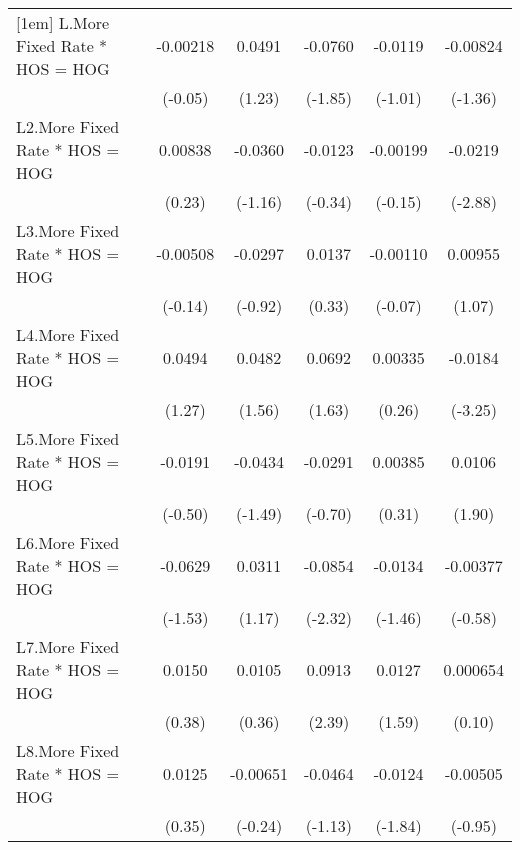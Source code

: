 {\begin{longtable}{l*{5}{c}}
[1em]
L.More Fixed Rate * HOS = HOG& -0.00218         &   0.0491         &  -0.0760         &  -0.0119         & -0.00824         \\
                &  (-0.05)         &   (1.23)         &  (-1.85)         &  (-1.01)         &  (-1.36)         \\
[1em]
L2.More Fixed Rate * HOS = HOG&  0.00838         &  -0.0360         &  -0.0123         & -0.00199         &  -0.0219\sym{**} \\
                &   (0.23)         &  (-1.16)         &  (-0.34)         &  (-0.15)         &  (-2.88)         \\
[1em]
L3.More Fixed Rate * HOS = HOG& -0.00508         &  -0.0297         &   0.0137         & -0.00110         &  0.00955         \\
                &  (-0.14)         &  (-0.92)         &   (0.33)         &  (-0.07)         &   (1.07)         \\
[1em]
L4.More Fixed Rate * HOS = HOG&   0.0494         &   0.0482         &   0.0692         &  0.00335         &  -0.0184\sym{**} \\
                &   (1.27)         &   (1.56)         &   (1.63)         &   (0.26)         &  (-3.25)         \\
[1em]
L5.More Fixed Rate * HOS = HOG&  -0.0191         &  -0.0434         &  -0.0291         &  0.00385         &   0.0106         \\
                &  (-0.50)         &  (-1.49)         &  (-0.70)         &   (0.31)         &   (1.90)         \\
[1em]
L6.More Fixed Rate * HOS = HOG&  -0.0629         &   0.0311         &  -0.0854\sym{*}  &  -0.0134         & -0.00377         \\
                &  (-1.53)         &   (1.17)         &  (-2.32)         &  (-1.46)         &  (-0.58)         \\
[1em]
L7.More Fixed Rate * HOS = HOG&   0.0150         &   0.0105         &   0.0913\sym{*}  &   0.0127         & 0.000654         \\
                &   (0.38)         &   (0.36)         &   (2.39)         &   (1.59)         &   (0.10)         \\
[1em]
L8.More Fixed Rate * HOS = HOG&   0.0125         & -0.00651         &  -0.0464         &  -0.0124         & -0.00505         \\
                &   (0.35)         &  (-0.24)         &  (-1.13)         &  (-1.84)         &  (-0.95)         \\

\end{longtable}}
